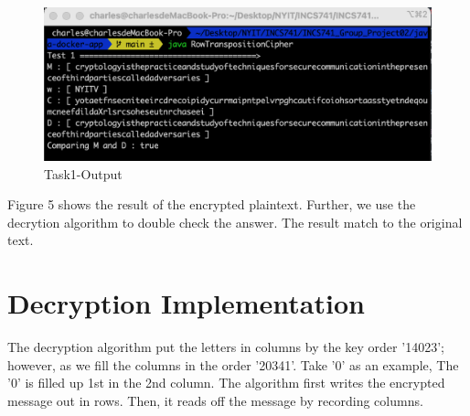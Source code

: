 \documentclass[twoside,twocolumn]{article}
\begin{document}
\begin{figure}[H]
  \centering
  \includegraphics[scale=0.35]{./Graphs/Figure1.6.png}
  \caption{Task1-Output}
  \label{fig:testfig1}
\end{figure}

Figure 5 shows the result of the encrypted plaintext. Further, we use the decrytion algorithm to double check the answer. The result match to the original text.\\ 

\vspace*{-0.10cm}
\section{Decryption Implementation}

The decryption algorithm put the letters in columns by the key order '14023'; however, as we fill the columns in the order '20341'. Take '0' as an example, The '0' is filled up 1st in the 2nd column. The algorithm first writes the encrypted message out in rows. Then, it reads off the message by recording columns. \\
\end{document}
